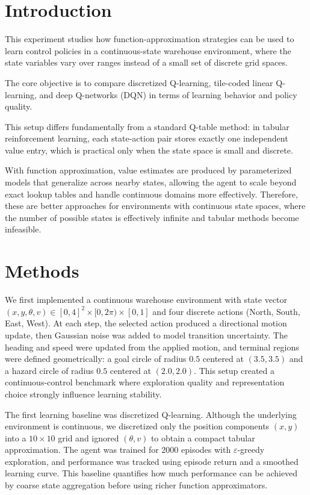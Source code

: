 \documentclass[10pt,twocolumn]{article}
\begin{document}
\section{Introduction} 

This experiment studies how function-approximation strategies can be used to learn control policies in a continuous-state warehouse environment, where the state variables vary over ranges instead of a small set of discrete grid spaces. 

The core objective is to compare discretized Q-learning, tile-coded linear Q-learning, and deep Q-networks (DQN) in terms of learning behavior and policy quality. 

This setup differs fundamentally from a standard Q-table method: in tabular reinforcement learning, each state-action pair stores exactly one independent value entry, which is practical only when the state space is small and discrete. 

With function approximation, value estimates are produced by parameterized models that generalize across nearby states, allowing the agent to scale beyond exact lookup tables and handle continuous domains more effectively.
Therefore, these are better approaches for environments with continuous state spaces, where the number of possible states is effectively infinite and tabular methods become infeasible.

\section{Methods}

We first implemented a continuous warehouse environment with state vector $(x,y,\theta,v) \in [0,4]^2 \times [0,2\pi) \times [0,1]$ and four discrete actions (North, South, East, West). At each step, the selected action produced a directional motion update, then Gaussian noise was added to model transition uncertainty. The heading and speed were updated from the applied motion, and terminal regions were defined geometrically: a goal circle of radius $0.5$ centered at $(3.5,3.5)$ and a hazard circle of radius $0.5$ centered at $(2.0,2.0)$. This setup created a continuous-control benchmark where exploration quality and representation choice strongly influence learning stability.

The first learning baseline was discretized Q-learning. Although the underlying environment is continuous, we discretized only the position components $(x,y)$ into a $10 \times 10$ grid and ignored $(\theta,v)$ to obtain a compact tabular approximation. The agent was trained for 2000 episodes with $\varepsilon$-greedy exploration, and performance was tracked using episode return and a smoothed learning curve. This baseline quantifies how much performance can be achieved by coarse state aggregation before using richer function approximators.
\end{document}
